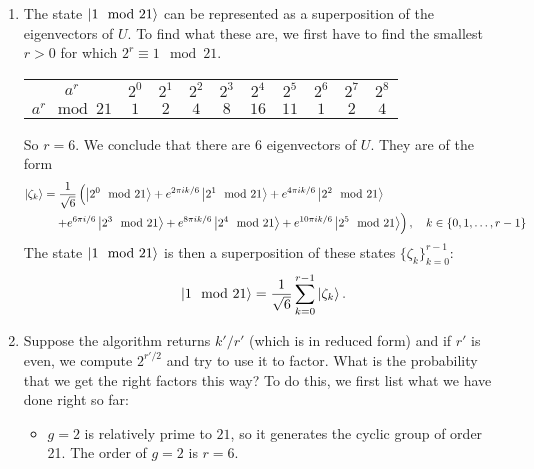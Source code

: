 \documentclass{article}
\theoremstyle{definition}
\newcommand{\f}[2]{\frac{#1}{#2}}
\newcommand{\lp}{\left(}
\newcommand{\rp}{\right)}
\begin{document}
\begin{enumerate}[label=(\alph*)]

\item The state $\ket{1 \mod 21}$ can be represented as a superposition of the  eigenvectors of $U$. To find what these are, we first have to find the smallest $r > 0$ for which $2^r \equiv 1 \mod 21$. 

\begin{center}
\begin{tabular}{ c | c  c  c c  c c c c c} 
 $a^r$  & $2^0$ & $2^1$ & $2^2$ & $2^3$ & $2^4$ & $2^5$  & $2^6$ & $2^7$ & $2^8$ \\ 
 $a^r \mod 21$  & $1$ & $2$ & $4$ & $8$ & $16$ & $11$  & $1$ & $2$ & $4$ \\ 
\end{tabular}
\end{center}

So $r = 6$. We conclude that there are $\boxed{6}$ eigenvectors of $U$. They are of the form
\begin{align*}
\ket{\zeta_k} &= \f{1}{\sqrt{6}} \lp \ket{2^0 \mod 21} + e^{2\pi i k/6} \ket{2^1 \mod 21}  +  e^{4\pi i k/6}\ket{2^2 \mod 21} \right. \\
&\left. \quad + e^{6\pi i /6} \ket{2^3 \mod 21} +  e^{8 \pi i k/6 }\ket{2^4 \mod 21} + e^{10 \pi i k/6} \ket{2^5\mod 21} \rp, \quad k \in \{ 0,1,\dots, r-1\}
\end{align*}  
The state $\ket{1\mod 21}$ is then a  superposition of these states $\{ \zeta_k \}_{k=0}^{r-1} $:
\begin{align*}
\ket{1\mod 21} =  \f{1}{\sqrt{6}} \sum_{k=0}^{r-1}  \ket{\zeta_{k}}.
\end{align*}


\item Suppose the algorithm returns $k'/r'$ (which is in reduced form) and if $r'$ is even, we compute $2^{r'/2}$ and try to use it to factor. What is the probability that we get the right factors this way? To do this, we first list what we have done right so far:
\begin{itemize}
\item $g=2$ is relatively prime to $21$, so it generates the cyclic group of order 21. The order of $g=2$ is $r=6$.


\end{itemize}
\end{enumerate}
\end{document}
